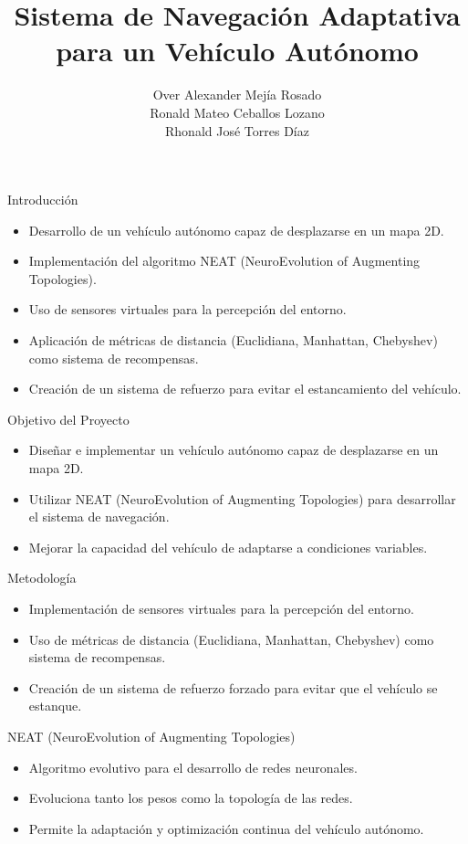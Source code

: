\documentclass{beamer}
\title{Sistema de Navegación Adaptativa para un Vehículo Autónomo}
\author{
    Over Alexander Mejía Rosado \\
    Ronald Mateo Ceballos Lozano \\
    Rhonald José Torres Díaz
}
\institute{\textit{Inteligencia Artificial} \\
Universidad Nacional de Colombia - De La Paz}
\date{}
\begin{document}
\begin{frame}
    \titlepage
\end{frame}

\begin{frame}{Introducción}
    \begin{itemize}
        \item Desarrollo de un vehículo autónomo capaz de desplazarse en un mapa 2D.
        \item Implementación del algoritmo NEAT (NeuroEvolution of Augmenting Topologies).
        \item Uso de sensores virtuales para la percepción del entorno.
        \item Aplicación de métricas de distancia (Euclidiana, Manhattan, Chebyshev) como sistema de recompensas.
        \item Creación de un sistema de refuerzo para evitar el estancamiento del vehículo.
    \end{itemize}
\end{frame}

\begin{frame}{Objetivo del Proyecto}
    \begin{itemize}
        \item Diseñar e implementar un vehículo autónomo capaz de desplazarse en un mapa 2D.
        \item Utilizar NEAT (NeuroEvolution of Augmenting Topologies) para desarrollar el sistema de navegación.
        \item Mejorar la capacidad del vehículo de adaptarse a condiciones variables.
    \end{itemize}
\end{frame}

\begin{frame}{Metodología}
    \begin{itemize}
        \item Implementación de sensores virtuales para la percepción del entorno.
        \item Uso de métricas de distancia (Euclidiana, Manhattan, Chebyshev) como sistema de recompensas.
        \item Creación de un sistema de refuerzo forzado para evitar que el vehículo se estanque.
    \end{itemize}
\end{frame}

\begin{frame}{NEAT (NeuroEvolution of Augmenting Topologies)}
    \begin{itemize}
        \item Algoritmo evolutivo para el desarrollo de redes neuronales.
        \item Evoluciona tanto los pesos como la topología de las redes.
        \item Permite la adaptación y optimización continua del vehículo autónomo.
    \end{itemize}
\end{frame}
\end{document}
